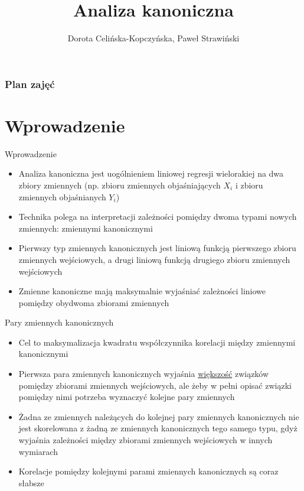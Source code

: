 \documentclass{beamer}
\begin{document}
\begin{frame}
\title[Tytuł]{Analiza kanoniczna}

\author{Dorota Celińska-Kopczyńska, Paweł Strawiński}

\titlepage
\end{frame}
\begin{frame}[allowframebreaks]
\frametitle{Plan zajęć}
  \tableofcontents
\end{frame}

\section{Wprowadzenie}

\begin{frame}{Wprowadzenie}
  \begin{itemize}
  \item Analiza kanoniczna jest uogólnieniem liniowej regresji wielorakiej na dwa zbiory zmiennych (np. zbioru zmiennych objaśniających $X_i$ i zbioru zmiennych objaśnianych $Y_i$)
   \item Technika polega na interpretacji zależności pomiędzy dwoma typami nowych zmiennych: zmiennymi kanonicznymi
   \item Pierwszy typ zmiennych kanonicznych jest liniową funkcją pierwszego zbioru zmiennych wejściowych, a drugi liniową funkcją drugiego zbioru zmiennych wejściowych
   \item Zmienne kanoniczne mają maksymalnie wyjaśniać zależności liniowe pomiędzy obydwoma zbiorami zmiennych
  \end{itemize}
\end{frame}

\begin{frame}{Pary zmiennych kanonicznych}
  \begin{itemize}
  \item Cel to maksymalizacja kwadratu współczynnika korelacji między zmiennymi kanonicznymi
  \item Pierwsza para zmiennych kanonicznych wyjaśnia \underline{większość} związków pomiędzy zbiorami zmiennych wejściowych, ale żeby w pełni opisać związki pomiędzy nimi potrzeba wyznaczyć kolejne pary zmiennych
  \item Żadna ze zmiennych należących do kolejnej pary zmiennych kanonicznych nie jest skorelowana z żadną ze zmiennych kanonicznych tego samego typu, gdyż wyjaśnia zależności między zbiorami zmiennych wejściowych w innych wymiarach
  \item Korelacje pomiędzy kolejnymi parami zmiennych kanonicznych są coraz słabsze
  \end{itemize}
\end{frame}
\end{document}
